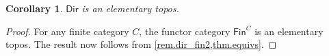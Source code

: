 \documentclass[11pt, article, one side]{memoir}
\theoremstyle{theorem}
\newtheorem{corollary}[equation]{Corollary}
\theoremstyle{definition}
\theoremstyle{remark}
\newcommand{\Cat}[1]{\mathsf{#1}}%
\newcommand{\ol}[1]{\overline{#1}}
\newcommand{\finset}{\Cat{Fin}}
\newcommand{\bun}{\Cat{Bun}}
\newcommand{\yon}{\mathcal{y}}
\newcommand{\poly}{\Cat{Poly}}
\newcommand{\dir}{\Cat{Dir}}
\newcommand{\ff}{\mathbb{F}}
\newcommand{\qqand}{\qquad\text{and}\qquad}
\begin{document}
\begin{corollary}\label{cor.dir_topos}
$\dir$ is an elementary topos.
\end{corollary}
\begin{proof}
For any finite category $C$, the functor category $\finset^C$ is an elementary topos. The result now follows from \cref{rem.dir_fin2,thm.equivs}.
\end{proof}

%
%
%
\end{document}
